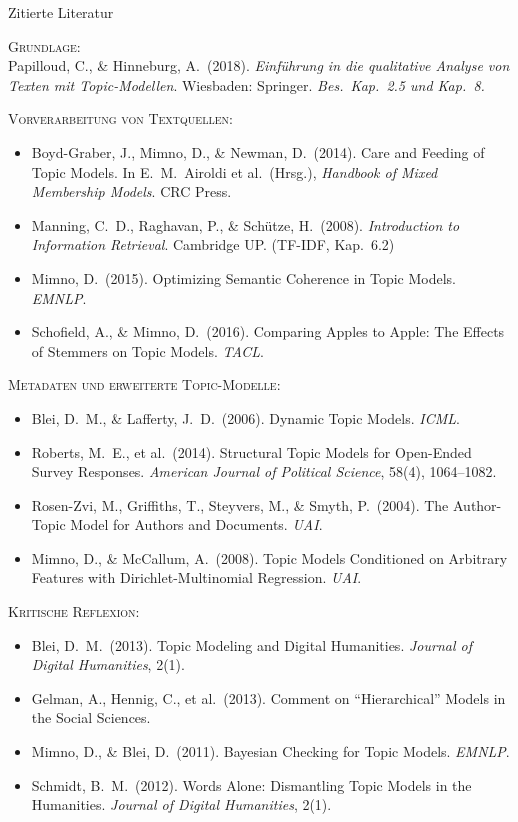 \documentclass[aspectratio=169,11pt]{beamer}
\let\oldemph\emph
\renewcommand{\emph}[1]{{\color{solCyan}\oldemph{#1}}}
\begin{document}
\begin{frame}[allowframebreaks]{Zitierte Literatur}

  \footnotesize

  \textsc{Grundlage:} \\[2pt]
  Papilloud, C., \& Hinneburg, A.\ (2018). \emph{Einführung in die
  qualitative Analyse von Texten mit Topic-Modellen}. Wiesbaden:
  Springer. \emph{Bes.\ Kap.\ 2.5 und Kap.\ 8.}

  \medskip
  \textsc{Vorverarbeitung von Textquellen:}
  \begin{itemize}
    \item Boyd-Graber, J., Mimno, D., \& Newman, D.\ (2014).
          Care and Feeding of Topic Models. In E.\ M.\ Airoldi et al.\
          (Hrsg.), \emph{Handbook of Mixed Membership Models}. CRC Press.
    \item Manning, C.\ D., Raghavan, P., \& Schütze, H.\ (2008).
          \emph{Introduction to Information Retrieval}. Cambridge UP.
          (TF-IDF, Kap.\ 6.2)
    \item Mimno, D.\ (2015). Optimizing Semantic Coherence in Topic
          Models. \emph{EMNLP}.
    \item Schofield, A., \& Mimno, D.\ (2016). Comparing Apples to
          Apple: The Effects of Stemmers on Topic Models. \emph{TACL}.
  \end{itemize}

  \medskip
  \textsc{Metadaten und erweiterte Topic-Modelle:}
  \begin{itemize}
    \item Blei, D.\ M., \& Lafferty, J.\ D.\ (2006). Dynamic Topic
          Models. \emph{ICML}.
    \item Roberts, M.\ E., et al.\ (2014). Structural Topic Models for
          Open-Ended Survey Responses. \emph{American Journal of
          Political Science}, 58(4), 1064–1082.
    \item Rosen-Zvi, M., Griffiths, T., Steyvers, M., \& Smyth, P.\
          (2004). The Author-Topic Model for Authors and Documents.
          \emph{UAI}.
    \item Mimno, D., \& McCallum, A.\ (2008). Topic Models Conditioned
          on Arbitrary Features with Dirichlet-Multinomial Regression.
          \emph{UAI}.
  \end{itemize}

  \medskip
  \textsc{Kritische Reflexion:}
  \begin{itemize}
    \item Blei, D.\ M.\ (2013). Topic Modeling and Digital Humanities.
          \emph{Journal of Digital Humanities}, 2(1).
    \item Gelman, A., Hennig, C., et al.\ (2013). Comment on
          \enquote{Hierarchical} Models in the Social Sciences.
    \item Mimno, D., \& Blei, D.\ (2011). Bayesian Checking for Topic
          Models. \emph{EMNLP}.
    \item Schmidt, B.\ M.\ (2012). Words Alone: Dismantling Topic
          Models in the Humanities. \emph{Journal of Digital
          Humanities}, 2(1).
  \end{itemize}


\end{frame}
\end{document}
